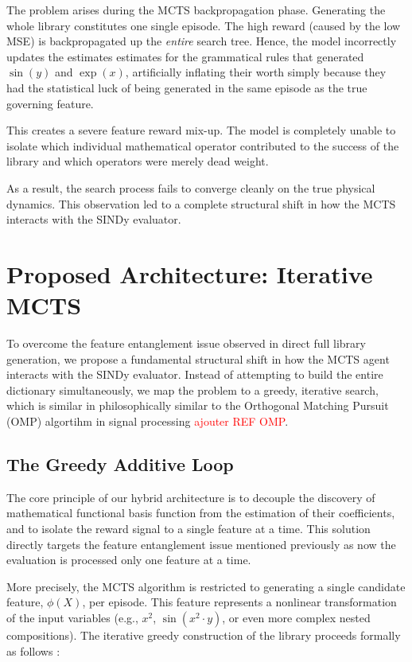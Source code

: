 \documentclass[11pt, a4paper]{article}
\begin{document}
The problem arises during the MCTS backpropagation phase. Generating the whole library constitutes one single episode. The high reward (caused by the low MSE) is backpropagated up the \textit{entire} search tree. Hence, the model incorrectly updates the estimates estimates for the grammatical rules that generated $\sin(y)$ and $\exp(x)$, artificially inflating their worth simply because they had the statistical luck of being generated in the same episode as the true governing feature. 

This creates a severe feature reward mix-up. The model is completely unable to isolate which individual mathematical operator contributed to the success of the library and which operators were merely dead weight. 

As a result, the search process fails to converge cleanly on the true physical dynamics. This observation led to a complete structural shift in how the MCTS interacts with the SINDy evaluator.



\section{Proposed Architecture: Iterative MCTS}

To overcome the feature entanglement issue observed in direct full library generation, we propose a fundamental structural shift in how the MCTS agent interacts with the SINDy evaluator. Instead of attempting to build the entire dictionary simultaneously, we map the problem to a greedy, iterative search, which is similar in philosophically similar to the Orthogonal Matching Pursuit (OMP) algortihm in signal processing \textcolor{red}{ajouter REF OMP}. 

\subsection{The Greedy Additive Loop}

The core principle of our hybrid architecture is to decouple the discovery of mathematical functional basis function from the estimation of their coefficients, and to isolate the reward signal to a single feature at a time. This solution directly targets the feature entanglement issue mentioned previously as now the evaluation is processed only one feature at a time.

More precisely, the MCTS algorithm is restricted to generating a single candidate feature, $\phi(X)$, per episode. This feature represents a nonlinear transformation of the input variables (e.g., $x^2$, $\sin(x^2 \cdot y)$, or even more complex nested compositions). The iterative greedy construction of the library proceeds formally as follows :
\end{document}
